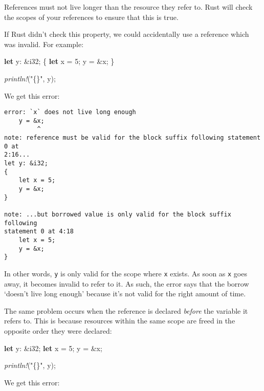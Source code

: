 \documentclass[a4paper,]{book}
\newenvironment{Shaded}{\begin{snugshade}}{\end{snugshade}}
\newcommand{\KeywordTok}[1]{\textcolor[rgb]{0.13,0.29,0.53}{\textbf{{#1}}}}
\newcommand{\DataTypeTok}[1]{\textcolor[rgb]{0.13,0.29,0.53}{{#1}}}
\newcommand{\DecValTok}[1]{\textcolor[rgb]{0.00,0.00,0.81}{{#1}}}
\newcommand{\StringTok}[1]{\textcolor[rgb]{0.31,0.60,0.02}{{#1}}}
\newcommand{\PreprocessorTok}[1]{\textcolor[rgb]{0.56,0.35,0.01}{\textit{{#1}}}}
\newcommand{\NormalTok}[1]{{#1}}
\begin{document}
References must not live longer than the resource they refer to. Rust
will check the scopes of your references to ensure that this is true.

If Rust didn't check this property, we could accidentally use a
reference which was invalid. For example:

\begin{Shaded}
\begin{Highlighting}[]
\KeywordTok{let} \NormalTok{y: &}\DataTypeTok{i32}\NormalTok{;}
\NormalTok{\{ }
    \KeywordTok{let} \NormalTok{x = }\DecValTok{5}\NormalTok{;}
    \NormalTok{y = &x;}
\NormalTok{\}}

\PreprocessorTok{println!}\NormalTok{(}\StringTok{"\{\}"}\NormalTok{, y);}
\end{Highlighting}
\end{Shaded}

We get this error:

\begin{verbatim}
error: `x` does not live long enough
    y = &x;
         ^
note: reference must be valid for the block suffix following statement 0 at
2:16...
let y: &i32;
{ 
    let x = 5;
    y = &x;
}

note: ...but borrowed value is only valid for the block suffix following
statement 0 at 4:18
    let x = 5;
    y = &x;
}
\end{verbatim}

In other words, \texttt{y} is only valid for the scope where \texttt{x}
exists. As soon as \texttt{x} goes away, it becomes invalid to refer to
it. As such, the error says that the borrow `doesn't live long enough'
because it's not valid for the right amount of time.

The same problem occurs when the reference is declared \emph{before} the
variable it refers to. This is because resources within the same scope
are freed in the opposite order they were declared:

\begin{Shaded}
\begin{Highlighting}[]
\KeywordTok{let} \NormalTok{y: &}\DataTypeTok{i32}\NormalTok{;}
\KeywordTok{let} \NormalTok{x = }\DecValTok{5}\NormalTok{;}
\NormalTok{y = &x;}

\PreprocessorTok{println!}\NormalTok{(}\StringTok{"\{\}"}\NormalTok{, y);}
\end{Highlighting}
\end{Shaded}

We get this error:
\end{document}
